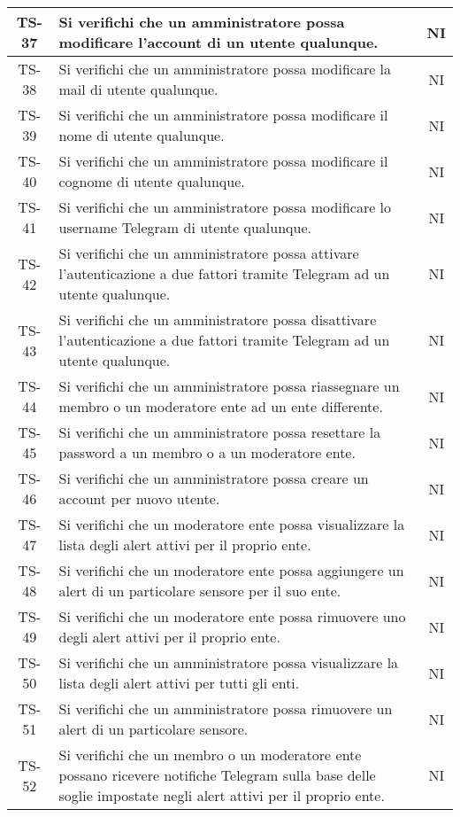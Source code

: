 \begin{center}
\begin{longtable}{|c|p{10cm}|c|}
			 \hline
			 TS-37 & Si verifichi che un amministratore possa modificare l'account di un utente qualunque. & NI \\
			 \hline
			 TS-38 & Si verifichi che un amministratore possa modificare la mail di utente qualunque. & NI \\
			 \hline
			 TS-39 & Si verifichi che un amministratore possa modificare il nome di utente qualunque. & NI \\
			 \hline
			 TS-40 & Si verifichi che un amministratore possa modificare il cognome di utente qualunque. & NI \\
			 \hline
			 TS-41 & Si verifichi che un amministratore possa modificare lo username Telegram di utente qualunque. & NI \\
			 \hline
			 TS-42 & Si verifichi che un amministratore possa attivare l'autenticazione a due fattori tramite Telegram ad un utente qualunque. & NI \\
			 \hline
			 TS-43 & Si verifichi che un amministratore possa disattivare l'autenticazione a due fattori tramite Telegram ad un utente qualunque. & NI \\
			 \hline
			 TS-44 & Si verifichi che un amministratore possa riassegnare un membro o un moderatore ente ad un ente differente. & NI \\
			 \hline
			 TS-45 & Si verifichi che un amministratore possa resettare la password a un membro o a un moderatore ente. & NI \\
			 \hline
			 TS-46 & Si verifichi che un amministratore possa creare un account per nuovo utente. & NI \\
			 \hline
			 TS-47 & Si verifichi che un moderatore ente possa visualizzare la lista degli alert attivi per il proprio ente. & NI \\
			 \hline
			 TS-48 & Si verifichi che un moderatore ente possa aggiungere un alert di un particolare sensore per il suo ente. & NI \\
			 \hline
			 TS-49 & Si verifichi che un moderatore ente possa rimuovere uno degli alert attivi per il proprio ente. & NI \\
			 \hline
			 TS-50 & Si verifichi che un amministratore possa visualizzare la lista degli alert attivi per tutti gli enti. & NI \\
			 \hline
			 TS-51 & Si verifichi che un amministratore possa rimuovere un alert di un particolare sensore. & NI \\
			 \hline
			 TS-52 & Si verifichi che un membro o un moderatore ente possano ricevere notifiche Telegram sulla base delle soglie impostate negli alert attivi per il proprio ente. & NI \\

\end{longtable}
\end{center}
